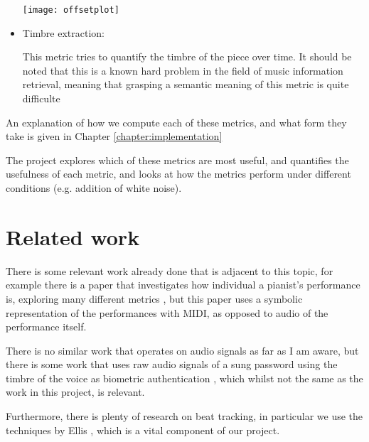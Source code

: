 \documentclass[oneside, class=book, crop=false, 12pt]{standalone}
\begin{document}
\begin{itemize}
\begin{minipage}{\textwidth}
  \centering
  \texttt{[image: offsetplot]}
  \label{figure:offsetsplot}
\end{minipage}



  \item
    Timbre extraction:

    This metric tries to quantify the timbre of the piece over time. It should be noted that this is a known hard problem in the field of music information retrieval, meaning that grasping a semantic meaning of this metric is quite difficulte
\end{itemize}





An explanation of how we compute each of these metrics, and what form they take is given in Chapter \ref{chapter:implementation}

The project explores which of these metrics are most useful, and quantifies the usefulness of each metric, and looks at how the metrics perform under different conditions (e.g. addition of white noise).


\section{Related work}

There is some relevant work already done that is adjacent to this topic, for example there is a paper that investigates how individual a pianist's performance is, exploring many different metrics \cite{bernays14}, but this paper uses a symbolic representation of the performances with MIDI, as opposed to audio of the performance itself.

There is no similar work that operates on audio signals as far as I am aware, but there is some work that uses raw audio signals of a sung password using the timbre of the voice as biometric authentication \cite{prakash16}, which whilst not the same as the work in this project, is relevant.

Furthermore, there is plenty of research on beat tracking, in particular we use the techniques by Ellis \cite{ellis07}, which is a vital component of our project.


\ifstandalone
  \printbibliography[heading=subbibliography]
\fi
    
\end{document}
